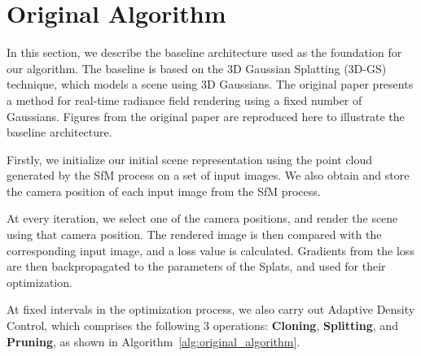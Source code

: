 \documentclass[11pt]{report}
\begin{document}
\section{Original Algorithm}



In this section, we describe the baseline architecture used as the foundation for our algorithm. The baseline is based on the 3D Gaussian Splatting (3D-GS) technique, which models a scene using 3D Gaussians. The original paper presents a method for real-time radiance field rendering using a fixed number of Gaussians. Figures from the original paper are reproduced here to illustrate the baseline architecture.

Firstly, we initialize our initial scene representation using the point cloud generated by the SfM process on a set of input images. We also obtain and store the camera position of each input image from the SfM process.

At every iteration, we select one of the camera positions, and render the scene using that camera position. The rendered image is then compared with the corresponding input image, and a loss value is calculated. Gradients from the loss are then backpropagated to the parameters of the Splats, and used for their optimization.

At fixed intervals in the optimization process, we also carry out Adaptive Density Control, which comprises the following 3 operations: \textbf{Cloning}, \textbf{Splitting}, and \textbf{Pruning}, as shown in Algorithm~\ref{alg:original_algorithm}.
\end{document}
